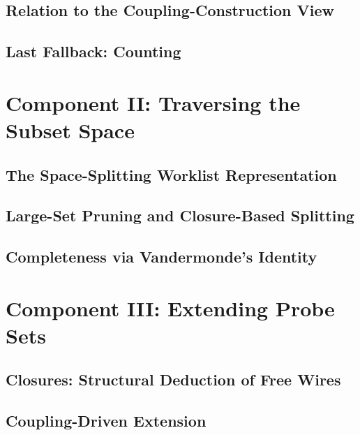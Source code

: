   \subsection{Relation to the Coupling-Construction View}
  \subsection{Last Fallback: Counting}
\section{Component II: Traversing the Subset Space}
  \subsection{The Space-Splitting Worklist Representation}
  \subsection{Large-Set Pruning and Closure-Based Splitting}
  \subsection{Completeness via Vandermonde's Identity}
\section{Component III: Extending Probe Sets}
  \subsection{Closures: Structural Deduction of Free Wires}
  \subsection{Coupling-Driven Extension}
